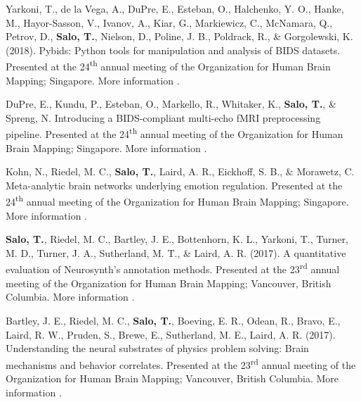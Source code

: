 \documentclass[10pt]{article}
\newcommand{\textlink}[3][blue]{\href{#2}{\color{#1}{#3}}}
\begin{document}
\begin{hangparas}{.25in}{1}

	Yarkoni, T., de la Vega, A., DuPre, E., Esteban, O., Halchenko, Y. O.,
	Hanke, M., Hayor-Sasson, V., Ivanov, A., Kiar, G., Markiewicz, C., McNamara, Q.,
	Petrov, D., \textbf{Salo, T.}, Nielson, D., Poline, J. B., Poldrack, R.,
	\& Gorgolewski, K. (2018).
	Pybids: Python tools for manipulation and analysis of BIDS datasets.
	Presented at the 24\textsuperscript{th} annual meeting of the Organization
	for Human Brain Mapping; Singapore.
	More information
	\textlink{https://ww5.aievolution.com/hbm1801/index.cfm?do=abs.viewAbs&abs=3300}{here}.

	\bigskip

	DuPre, E., Kundu, P., Esteban, O., Markello, R., Whitaker, K.,
	\textbf{Salo, T.}, \& Spreng, N.
	Introducing a BIDS-compliant multi-echo fMRI preprocessing pipeline.
	Presented at the 24\textsuperscript{th} annual meeting of the Organization
	for Human Brain Mapping; Singapore.
	More information
	\textlink{https://ww5.aievolution.com/hbm1801/index.cfm?do=abs.viewAbs&abs=2789}{here}.

	\bigskip

	Kohn, N., Riedel, M. C., \textbf{Salo, T.}, Laird, A. R., Eickhoff, S. B.,
	\& Morawetz, C.
	Meta-analytic brain networks underlying emotion regulation.
	Presented at the 24\textsuperscript{th} annual meeting of the Organization
	for Human Brain Mapping; Singapore.
	More information
	\textlink{https://ww5.aievolution.com/hbm1801/index.cfm?do=abs.viewAbs&abs=1262}{here}.

	\bigskip

	\textbf{Salo, T.}, Riedel, M. C., Bartley, J. E., Bottenhorn, K. L., Yarkoni, T.,
	Turner, M. D., Turner, J. A., Sutherland, M. T., \& Laird, A. R. (2017).
	A quantitative evaluation of Neurosynth's annotation methods. Presented at
	the 23\textsuperscript{rd} annual meeting of the Organization for Human Brain
	Mapping; Vancouver, British Columbia. More information
	\textlink{https://nbclab.github.io/posters/salo-neurosynth-poster}{here}.

	\bigskip

	Bartley, J. E., Riedel, M. C., \textbf{Salo, T.}, Boeving, E. R., Odean, R.,
	Bravo, E., Laird, R. W., Pruden, S., Brewe, E., Sutherland, M. E., Laird, A. R.
	(2017). Understanding the neural substrates of physics problem solving: Brain
	mechanisms and behavior correlates. Presented at the 23\textsuperscript{rd}
	annual meeting of the Organization for Human Brain Mapping; Vancouver, British
	Columbia. More information
	\textlink{https://nbclab.github.io/posters/bartley-physics-poster}{here}.


\end{hangparas}
\end{document}
